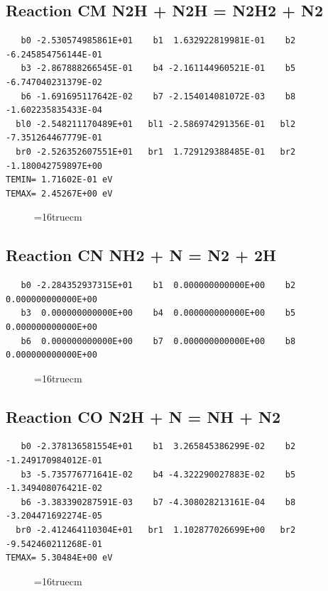 \documentclass[12pt,dvipdfm]{article}
\begin{document}
\subsection{
Reaction CM N2H + N2H = N2H2 + N2 }
\begin{small}\begin{verbatim}
   b0 -2.530574985861E+01    b1  1.632922819981E-01    b2 -6.245854756144E-01
   b3 -2.867888266545E-01    b4 -2.161144960521E-01    b5 -6.747040231379E-02
   b6 -1.691695117642E-02    b7 -2.154014081072E-03    b8 -1.602235835433E-04
  bl0 -2.548211170489E+01   bl1 -2.586974291356E-01   bl2 -7.351264467779E-01
  br0 -2.526352607551E+01   br1  1.729129388485E-01   br2 -1.180042759897E+00
TEMIN= 1.71602E-01 eV
TEMAX= 2.45267E+00 eV
   \end{verbatim}\end{small}
\begin{figure}[h!]
\label{n2rates}
\epsfxsize=16truecm
\end{figure}
\newpage

\subsection{
Reaction CN NH2 + N = N2 + 2H }
\begin{small}\begin{verbatim}
   b0 -2.284352937315E+01    b1  0.000000000000E+00    b2  0.000000000000E+00
   b3  0.000000000000E+00    b4  0.000000000000E+00    b5  0.000000000000E+00
   b6  0.000000000000E+00    b7  0.000000000000E+00    b8  0.000000000000E+00
   \end{verbatim}\end{small}
\begin{figure}[h!]
\label{n2rates}
\epsfxsize=16truecm
\end{figure}
\newpage

\subsection{
Reaction CO N2H + N = NH + N2 }
\begin{small}\begin{verbatim}
   b0 -2.378136581554E+01    b1  3.265845386299E-02    b2 -1.249170984012E-01
   b3 -5.735776771641E-02    b4 -4.322290027883E-02    b5 -1.349408076421E-02
   b6 -3.383390287591E-03    b7 -4.308028213161E-04    b8 -3.204471692274E-05
  br0 -2.412464110304E+01   br1  1.102877026699E+00   br2 -9.542460211268E-01
TEMAX= 5.30484E+00 eV
   \end{verbatim}\end{small}
\begin{figure}[h!]
\label{n2rates}
\epsfxsize=16truecm
\end{figure}
\newpage
\end{document}
